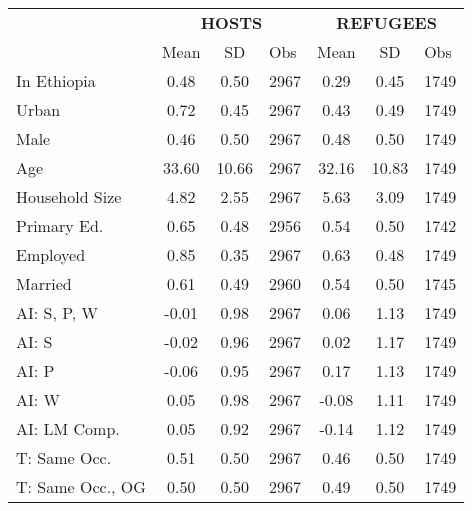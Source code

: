 {
\def\sym#1{\ifmmode^{#1}\else\(^{#1}\)\fi}
\begin{tabular}{l*{2}{ccc}}
\toprule
                    &\multicolumn{3}{c}{\textbf{HOSTS}}    &\multicolumn{3}{c}{\textbf{REFUGEES}} \\
                    &\multicolumn{1}{c}{{Mean}}&\multicolumn{1}{c}{{SD}}&\multicolumn{1}{l}{{Obs}}&\multicolumn{1}{c}{{Mean}}&\multicolumn{1}{c}{{SD}}&\multicolumn{1}{l}{{Obs}}\\
\midrule
In Ethiopia &        0.48&        0.50&        2967&        0.29&        0.45&        1749\\
\addlinespace
Urban               &        0.72&        0.45&        2967&        0.43&        0.49&        1749\\
\addlinespace
Male                &        0.46&        0.50&        2967&        0.48&        0.50&        1749\\
\addlinespace
Age &       33.60&       10.66&        2967&       32.16&       10.83&        1749\\
\addlinespace
Household Size      &        4.82&        2.55&        2967&        5.63&        3.09&        1749\\
\addlinespace
 Primary Ed. &        0.65&        0.48&        2956&        0.54&        0.50&        1742\\
\addlinespace
Employed   &        0.85&        0.35&        2967&        0.63&        0.48&        1749\\
\addlinespace
Married             &        0.61&        0.49&        2960&        0.54&        0.50&        1745\\
\addlinespace
AI: S, P, W  &       -0.01&        0.98&        2967&        0.06&        1.13&        1749\\
\addlinespace
AI: S &       -0.02&        0.96&        2967&        0.02&        1.17&        1749\\
\addlinespace
AI: P &       -0.06&        0.95&        2967&        0.17&        1.13&        1749\\
\addlinespace
AI: W &        0.05&        0.98&        2967&       -0.08&        1.11&        1749\\
\addlinespace
AI: LM Comp. &        0.05&        0.92&        2967&       -0.14&        1.12&        1749\\
\addlinespace
T: Same Occ. &        0.51&        0.50&        2967&        0.46&        0.50&        1749\\
\addlinespace
T: Same Occ., OG &        0.50&        0.50&        2967&        0.49&        0.50&        1749\\
\bottomrule
\end{tabular}
}
